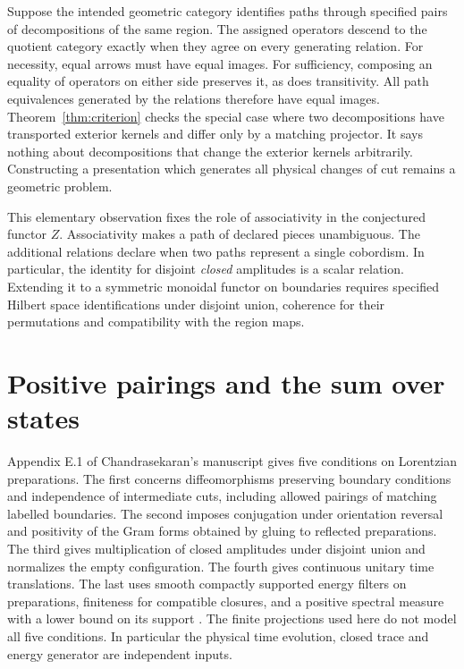 \documentclass[11pt,letterpaper]{article}
\begin{document}
Suppose the intended geometric category identifies paths through specified
pairs of decompositions of the same region. The assigned operators descend
to the quotient category exactly when they agree on every generating
relation. For necessity, equal arrows must have equal images. For sufficiency,
composing an equality of operators on either side preserves it, as does
transitivity. All path equivalences generated by the relations therefore
have equal images. Theorem~\ref{thm:criterion} checks the special case
where two decompositions have transported exterior kernels and differ
only by a matching projector. It says nothing about decompositions that
change the exterior kernels arbitrarily. Constructing a presentation
which generates all physical changes of cut remains a geometric problem.

This elementary observation fixes the role of associativity in the
conjectured functor \(Z\). Associativity makes a path of declared pieces
unambiguous. The additional relations declare when two paths represent a
single cobordism. In particular, the identity for disjoint \emph{closed}
amplitudes is a scalar relation. Extending it to a symmetric monoidal functor
on boundaries requires specified Hilbert space identifications under
disjoint union, coherence for their permutations and compatibility with
the region maps.

\section{Positive pairings and the sum over states}
\label{sec:analytic}
Appendix E.1 of Chandrasekaran's manuscript gives five conditions on
Lorentzian preparations. The first concerns diffeomorphisms preserving
boundary conditions and independence of intermediate cuts, including
allowed pairings of matching labelled boundaries. The second imposes
conjugation under orientation reversal and positivity of the Gram forms
obtained by gluing to reflected preparations. The third gives multiplication
of closed amplitudes under disjoint union and normalizes the empty
configuration. The fourth gives continuous unitary time translations.
The last uses smooth compactly supported energy filters on preparations,
finiteness for compatible closures, and a positive spectral measure with a
lower bound on its support \cite[App.~E.1]{nc}. The finite projections
used here do not model all five conditions. In particular the physical
time evolution, closed trace and energy generator are independent inputs.
\end{document}
